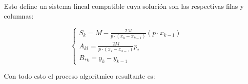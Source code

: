 \begin{aportacionOriginal}
Esto define un sistema lineal compatible
cuya solución son las respectivas filas y columnas: 

\begin{equation}
    \left\{ 
        \begin{array}{l}
            S_{k} = M -  \frac{2 M}{p \cdot (x_k - x_{k-1})}(p \cdot x_{k-1})\\
            A_{k i} = \frac{2 M}{p \cdot (x_k - x_{k-1})}
            p_{i}  
            \\
            B_{* k} = y_k - y_{k-1}
        \end{array}
    \right.
\end{equation}  

Con todo esto el proceso algorítmico resultante es: 

\end{aportacionOriginal} %



